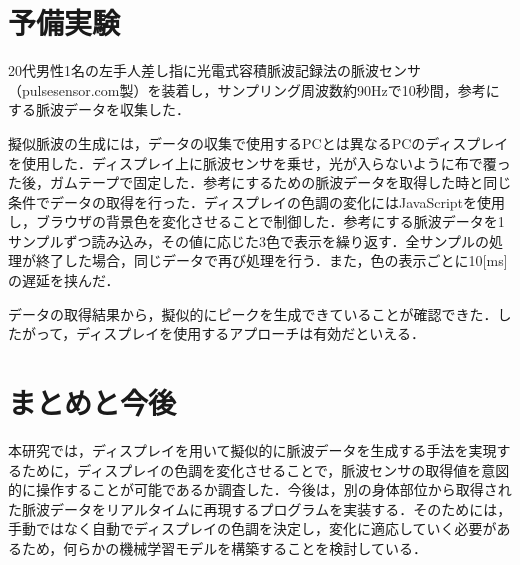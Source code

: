 \documentclass[Japanese,noauthor]{dicomopapers}
\begin{document}
\section{予備実験}
20代男性1名の左手人差し指に光電式容積脈波記録法の脈波センサ（pulsesensor.com製）を装着し，サンプリング周波数約90Hzで10秒間，参考にする脈波データを収集した．
\par

擬似脈波の生成には，データの収集で使用するPCとは異なるPCのディスプレイを使用した．ディスプレイ上に脈波センサを乗せ，光が入らないように布で覆った後，ガムテープで固定した．参考にするための脈波データを取得した時と同じ条件でデータの取得を行った．ディスプレイの色調の変化にはJavaScriptを使用し，ブラウザの背景色を変化させることで制御した．参考にする脈波データを1サンプルずつ読み込み，その値に応じた3色で表示を繰り返す．全サンプルの処理が終了した場合，同じデータで再び処理を行う．また，色の表示ごとに10[ms]の遅延を挟んだ．
\par

データの取得結果から，擬似的にピークを生成できていることが確認できた．したがって，ディスプレイを使用するアプローチは有効だといえる．


\section{まとめと今後}
本研究では，ディスプレイを用いて擬似的に脈波データを生成する手法を実現するために，ディスプレイの色調を変化させることで，脈波センサの取得値を意図的に操作することが可能であるか調査した．今後は，別の身体部位から取得された脈波データをリアルタイムに再現するプログラムを実装する．そのためには，手動ではなく自動でディスプレイの色調を決定し，変化に適応していく必要があるため，何らかの機械学習モデルを構築することを検討している．




\end{document}

